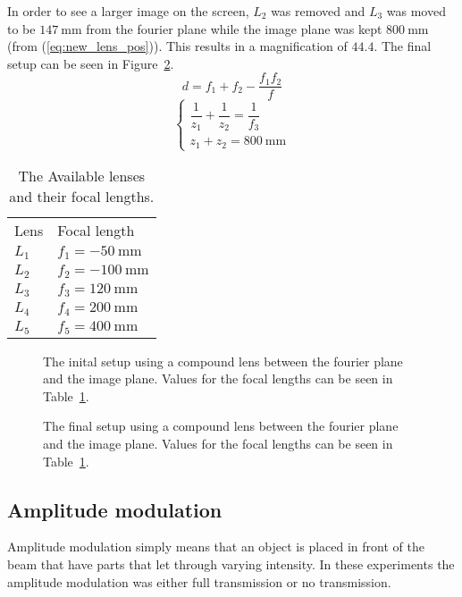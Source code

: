 \documentclass[12pt,a4paper]{article}
\begin{document}
In order to see a larger image on the screen, $L_2$ was removed and $L_3$ was moved to be $\SI{147}{\milli\metre}$ from the fourier plane while the image plane was kept $\SI{800}{\milli\metre}$ (from (\ref{eq:new_lens_pos})). This results in a magnification of $44.4$. The final setup can be seen in Figure~\ref{fig:setup_final}.
\begin{equation}
  \label{eq:clens_sep}
  d=f_1+f_2-\frac{f_1f_2}{f}
\end{equation}
\begin{equation}
  \label{eq:new_lens_pos}
  \begin{cases}
    \dfrac{1}{z_1}+\dfrac{1}{z_2}=\dfrac{1}{f_3} \\
    z_1+z_2=\SI{800}{\milli\metre}
  \end{cases}
\end{equation}
\begin{table}
  \centering
  \begin{tabular}{|l|l|}\hline
    Lens & Focal length \\
    $L_1$ & $f_1=\SI{-50}{\milli\metre}$ \\
    $L_2$ & $f_2=\SI{-100}{\milli\metre}$ \\
    $L_3$ & $f_3=\SI{120}{\milli\metre}$ \\
    $L_4$ & $f_4=\SI{200}{\milli\metre}$ \\
    $L_5$ & $f_5=\SI{400}{\milli\metre}$ \\ \hline
  \end{tabular}
  \caption{The Available lenses and their focal lengths.}
  \label{tab:lenses}
\end{table}
\begin{figure}
  \centering
  \noindent\makebox[\textwidth]{\scalebox{0.70}{}}
  \caption{The inital setup using a compound lens between the fourier plane and the image plane. Values for the focal lengths can be seen in Table~\ref{tab:lenses}.}
  \label{fig:setup0}
\end{figure}
\begin{figure}
  \centering
  \noindent\makebox[\textwidth]{\scalebox{0.70}{}}
  \caption{The final setup using a compound lens between the fourier plane and the image plane. Values for the focal lengths can be seen in Table~\ref{tab:lenses}.}
  \label{fig:setup_final}
\end{figure}

\subsection{Amplitude modulation}\label{sec:ampmod}
Amplitude modulation simply means that an object is placed in front of the beam that have parts that let through varying intensity. In these experiments the amplitude modulation was either full transmission or no transmission.
\end{document}
